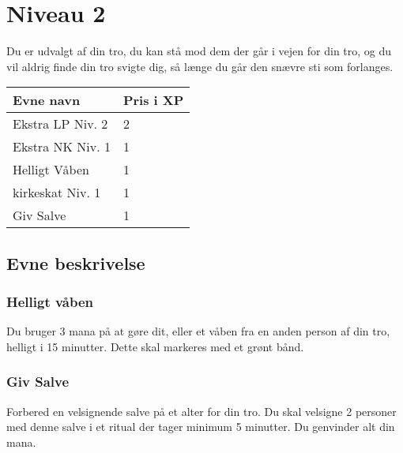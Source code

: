 \chapter{Niveau 2}
Du er udvalgt af din tro, du kan stå mod dem der går i vejen for din tro, og du vil aldrig finde din tro svigte dig, så længe du går den snævre sti som forlanges.

\begin{table}[H]
    \centering
    \begin{tabular}{|p{}|p{}|}
    \rowcolor{cerulean!80}\hline
    Evne navn & Pris i XP \\\hline
        Ekstra LP Niv. 2& 2\\\hline
        Ekstra NK Niv. 1& 1\\\hline
        Helligt Våben & 1\\\hline
        kirkeskat Niv. 1 & 1 \\\hline
        Giv Salve & 1\\\hline
    \end{tabular}
\end{table}
\section{Evne beskrivelse}



\subsection{Helligt våben}
Du bruger 3 mana på at gøre dit, eller et våben fra en anden person af din tro, helligt i 15 minutter. Dette skal markeres med et grønt bånd.



\subsection{Giv Salve}
Forbered en velsignende salve på et alter for din tro. Du skal velsigne 2 personer med denne salve i et ritual der tager minimum 5 minutter. Du genvinder alt din mana.